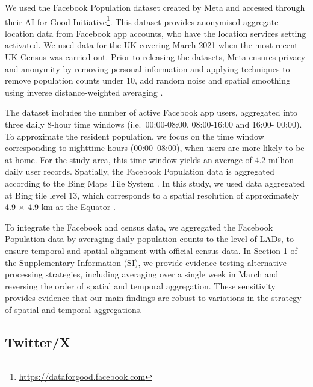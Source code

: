 \documentclass[]{rsos}%
\begin{document}
We used the Facebook Population dataset created by Meta and accessed
through their AI for Good Initiative\footnote{\url{https://dataforgood.facebook.com}}. This dataset provides
anonymised aggregate location data from Facebook app accounts, who have
the location services setting activated. We used data for the UK
covering March 2021 when the most recent UK Census was carried out.
Prior to releasing the datasets, Meta ensures privacy and anonymity by
removing personal information and applying techniques to remove
population counts under 10, add random noise and spatial smoothing using
inverse distance-weighted averaging \citep{maas2019}.

The dataset includes the number of active Facebook app users, aggregated
into three daily 8-hour time windows (i.e.~00:00-08:00, 08:00-16:00 and
16:00- 00:00). To approximate the resident population, we focus on the
time window corresponding to nighttime hours (00:00--08:00), when users
are more likely to be at home. For the study area, this time window
yields an average of 4.2 million daily user records. Spatially, the
Facebook Population data is aggregated according to the Bing Maps Tile
System \citep{bingmaps_tile_system}. In this study, we used data aggregated
at Bing tile level 13, which corresponds to a spatial resolution of
approximately 4.9 \(\times\) 4.9 km at the Equator \citep{maas2019}.

To integrate the Facebook and census data, we aggregated the Facebook
Population data by averaging daily population counts to the level of
LADs, to ensure temporal and spatial alignment with official census
data. In Section 1 of the Supplementary Information (SI), we provide
evidence testing alternative processing strategies, including averaging
over a single week in March and reversing the order of spatial and
temporal aggregation. These sensitivity provides evidence that our main
findings are robust to variations in the strategy of spatial and
temporal aggregations.

\subsection{Twitter/X}\label{twitterx}
\end{document}
